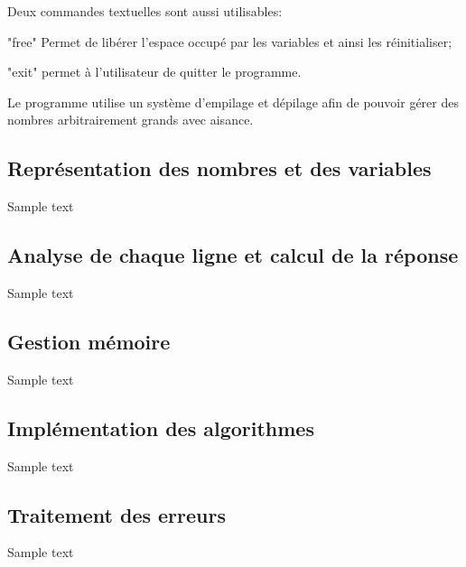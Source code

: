 \documentclass[]{report}
\begin{document}
\begin{normalsize}
		\vspace{4mm}
		\par Deux commandes textuelles sont aussi utilisables:
		\begin{description}[noitemsep]
			\item \hspace{4mm}"free" Permet de libérer l'espace occupé par les variables et ainsi les réinitialiser;
			\item \hspace{4mm}"exit" permet à l'utilisateur de quitter le programme.
		\end{description}
	\par Le programme utilise un système d'empilage et dépilage afin de pouvoir gérer des nombres arbitrairement grands avec aisance.
		\vspace{4mm}
		\newpage
	\end{normalsize}
	\begin{normalsize}
		\section*{\LARGE Représentation des nombres et des variables}
		Sample text
		\vspace{4mm}
	\end{normalsize}
	\begin{normalsize}
		\section*{\LARGE Analyse de chaque ligne et calcul de la réponse}
		Sample text
		\vspace{4mm}
	\end{normalsize}
	\begin{normalsize}
		\section*{\LARGE Gestion mémoire}
		Sample text
		\vspace{4mm}
	\end{normalsize}
	\begin{normalsize}
		\section*{\LARGE Implémentation des algorithmes}
		Sample text
		\vspace{4mm}
	\end{normalsize}
	\begin{normalsize}
		\section*{\LARGE Traitement des erreurs}
		Sample text
		\vspace{4mm}
	\end{normalsize}
\end{document}
